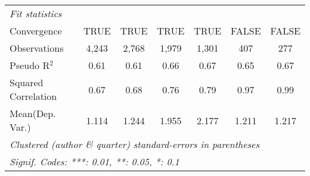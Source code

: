 \begin{tabular}{lcccccc}
   \midrule
   \emph{Fit statistics}\\
   Convergence                                                &TRUE          & TRUE         & TRUE         & TRUE        & FALSE      & FALSE\\  
   Observations                                               & 4,243        & 2,768        & 1,979        & 1,301       & 407        & 277\\  
   Pseudo R$^2$                                               & 0.61         & 0.61         & 0.66         & 0.67        & 0.65       & 0.67\\  
   Squared Correlation                                        & 0.67         & 0.68         & 0.76         & 0.79        & 0.97       & 0.99\\  
Mean(Dep. Var.) & 1.114 & 1.244 & 1.955 & 2.177 & 1.211 & 1.217 \\
   \midrule \midrule
   \multicolumn{7}{l}{\emph{Clustered (author \& quarter) standard-errors in parentheses}}\\
   \multicolumn{7}{l}{\emph{Signif. Codes: ***: 0.01, **: 0.05, *: 0.1}}\\
\end{tabular}
\par\endgroup
